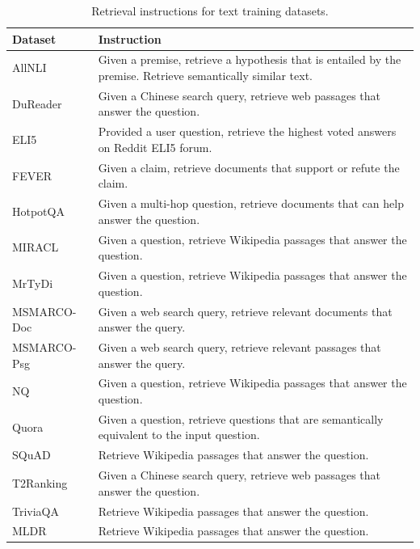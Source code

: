 \begin{table}[htbp]
\centering
\begin{tabularx}{0.9\textwidth}{p{3.5cm} X}
\toprule[.1em]
\textbf{Dataset} & \textbf{Instruction} \\
\midrule
AllNLI & Given a premise, retrieve a hypothesis that is entailed by the premise. Retrieve semantically similar text. \\
DuReader & Given a Chinese search query, retrieve web passages that answer the question. \\
ELI5 & Provided a user question, retrieve the highest voted answers on Reddit ELI5 forum. \\
FEVER & Given a claim, retrieve documents that support or refute the claim. \\
HotpotQA & Given a multi-hop question, retrieve documents that can help answer the question. \\
MIRACL & Given a question, retrieve Wikipedia passages that answer the question. \\
MrTyDi & Given a question, retrieve Wikipedia passages that answer the question. \\
MSMARCO-Doc & Given a web search query, retrieve relevant documents that answer the query. \\
MSMARCO-Psg & Given a web search query, retrieve relevant passages that answer the query. \\
NQ & Given a question, retrieve Wikipedia passages that answer the question. \\
Quora & Given a question, retrieve questions that are semantically equivalent to the input question. \\
SQuAD & Retrieve Wikipedia passages that answer the question. \\
T2Ranking & Given a Chinese search query, retrieve web passages that answer the question. \\
TriviaQA & Retrieve Wikipedia passages that answer the question. \\
MLDR & Retrieve Wikipedia passages that answer the question. \\
\bottomrule[.1em]
\end{tabularx}
\caption{Retrieval instructions for text training datasets.}
\label{tab:train_instructions_text}
\end{table}